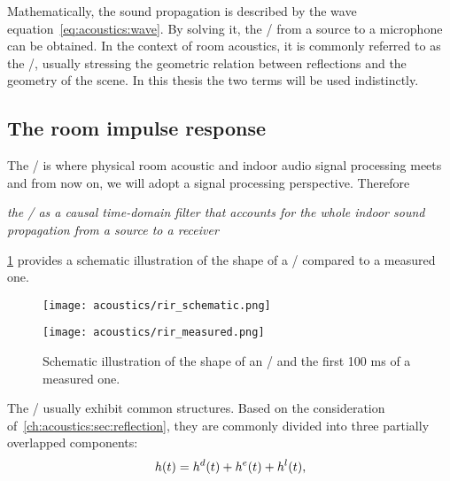 Mathematically, the sound propagation is described by the wave equation~\eqref{eq:acoustics:wave}.
By solving it, the \AIRdef/
from a source to a microphone can be obtained.
In the context of room acoustics, it is commonly referred to as the \RIRdef/, usually stressing
the geometric relation between reflections and the geometry of the scene.
In this thesis the two terms will be used indistinctly.

\subsection{The room impulse response}\label{ch:acoustics:subsec:rir}
The \RIRdef/ is where physical room acoustic and indoor audio signal processing meets and from now on, we will adopt a signal processing perspective.
Therefore
\begin{center}
\textit{the \RIR/ as a causal time-domain filter that accounts for the whole indoor sound propagation
from a source to a receiver}
\end{center}
\cref{fig:acoustics:rir} provides a schematic illustration of the shape of a \RIR/ compared to a measured one.
\begin{figure}[h]
    \centering
    \begin{minipage}[b]{.5\textwidth}
        \centering
        \texttt{[image: acoustics/rir\_schematic.png]}
    \end{minipage}%
    \begin{minipage}[b]{.5\textwidth}
        \centering
        \texttt{[image: acoustics/rir\_measured.png]}
    \end{minipage}
    \caption{Schematic illustration of the shape of an \RIR/ and the first 100 ms of a measured one.}
    \label{fig:acoustics:rir}
\end{figure}

The \RIRs/ usually exhibit common structures.
Based on the consideration of~\cref{ch:acoustics:sec:reflection}, they are commonly divided into three partially overlapped components:
\begin{equation}\label{eq:acoustics:rir_full}
h(t) = h^d(t) + h^e(t) + h^l(t)
,
\end{equation}

